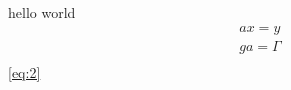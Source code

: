\documentclass[dvipdfmx]{jsarticle}
\begin{document}
hello world
\begin{eqnarray}
ax=y \label{eq:1} \\
ga= \Gamma \label{eq:2} \\
\end{eqnarray}
\ref{eq:2}
\end{document}
